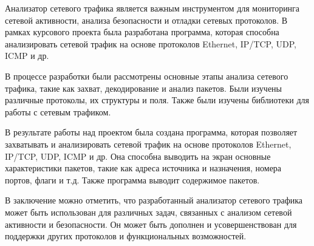 \label{sec:outro}

Анализатор сетевого трафика является важным инструментом для
мониторинга сетевой активности, анализа безопасности и отладки сетевых
протоколов. В рамках курсового проекта была разработана программа, которая
способна анализировать сетевой трафик на основе протоколов Ethernet,
IP/TCP, UDP, ICMP и др.

В процессе разработки были рассмотрены основные этапы анализа
сетевого трафика, такие как захват, декодирование и анализ пакетов. Были
изучены различные протоколы, их структуры и поля. Также были изучены
библиотеки для работы с сетевым трафиком.

В результате работы над проектом была создана программа, которая
позволяет захватывать и анализировать сетевой трафик на основе протоколов
Ethernet, IP/TCP, UDP, ICMP и др. Она способна выводить на экран основные
характеристики пакетов, такие как адреса источника и назначения, номера
портов, флаги и т.д. Также программа выводит содержимое пакетов.

В заключение можно отметить, что разработанный анализатор сетевого
трафика может быть использован для различных задач, связанных с анализом
сетевой активности и безопасности. Он может быть дополнен и
усовершенствован для поддержки других протоколов и функциональных
возможностей.
